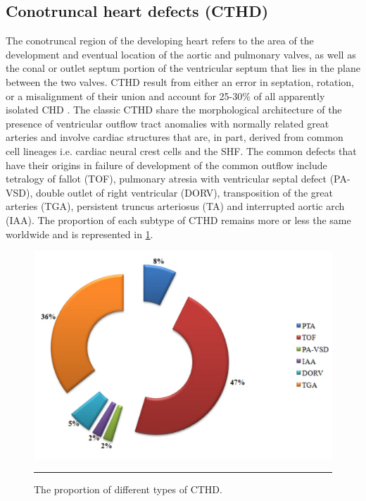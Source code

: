 \begin{refsection}
\section{Conotruncal heart defects (CTHD)}

The conotruncal region of the developing heart refers to the area of the development and eventual location of the aortic and pulmonary valves, as well as the conal or outlet septum portion of the ventricular septum that lies in the plane between the two valves. CTHD result from either an error in septation, rotation, or a misalignment of their union and account for 25-30\% of all apparently isolated CHD \cite{srivastava2006genetic}.
The classic CTHD share the morphological architecture of the presence of ventricular outflow tract anomalies with normally related great arteries and involve cardiac structures that are, in part, derived from common cell lineages i.e. cardiac neural crest cells and the SHF. The common defects that have their origins in failure of development of the common outflow include tetralogy of fallot (TOF), pulmonary atresia with ventricular septal defect (PA-VSD), double outlet of right ventricular (DORV), transposition of the great arteries (TGA), persistent truncus arteriosus (TA) and interrupted aortic arch (IAA). The proportion of each subtype of CTHD remains more or less the same worldwide and is represented in \cref{fig:1_2}.


\begin{figure}[!tb]
\centering
\includegraphics[scale=0.5,keepaspectratio]{Figures/Figure1_2.pdf}
\rule{35em}{0.5pt}
\caption[The proportion of different types of CTHD]{The proportion of different types of CTHD. \cite{pierpont2007genetic}}
\label{fig:1_2}
\end{figure}


\end{refsection}
